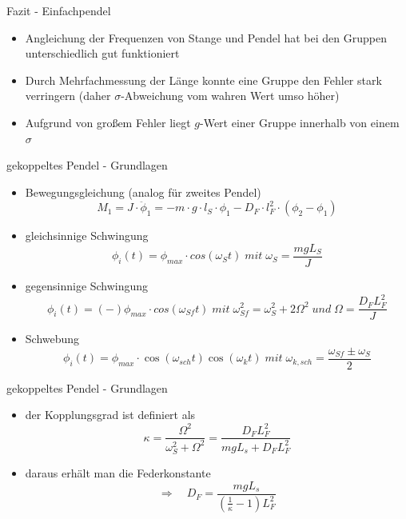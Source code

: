 \documentclass[12pt]{beamer}
\begin{document}
\begin{frame}{Fazit - Einfachpendel}
\begin{itemize}
	\item Angleichung der Frequenzen von Stange und Pendel hat bei den Gruppen unterschiedlich gut funktioniert
	\item Durch Mehrfachmessung der Länge konnte eine Gruppe den Fehler stark verringern (daher $\sigma$-Abweichung vom wahren Wert umso höher)
	\item Aufgrund von großem Fehler liegt $g$-Wert einer Gruppe innerhalb von einem $\sigma$
\end{itemize}
\end{frame}



\begin{frame}{gekoppeltes Pendel - Grundlagen}
\begin{itemize}
	\item Bewegungsgleichung (analog für zweites Pendel)
	\begin{equation*}
	M_1 = J \cdot \ddot \phi_1 = -m \cdot g \cdot l_S \cdot \phi_1 - D_F \cdot l_F^2 \cdot (\phi_2 - \phi_1)
	\end{equation*}
	\item gleichsinnige Schwingung
	\begin{equation*}
	\phi_i(t) = \phi_{max} \cdot cos(\omega_S t) \; mit \; \omega_S = \frac{mgL_S}{J}
	\end{equation*}
	\item gegensinnige Schwingung
	\begin{equation*}
	\phi_i(t) = (-)\phi_{max} \cdot cos(\omega_{Sf} t) \; mit \; \omega_{Sf}^2 = \omega_S^2 + 2\Omega^2 \; und \; \Omega = \frac{D_F L_F^2}{J}
	\end{equation*}
	\item Schwebung
	\begin{equation*}
	\phi_i(t) = \phi_{max} \cdot \cos(\omega_{sch} t)\cos(\omega_k t) \; mit \; \omega_{k,sch} = \frac{\omega_{Sf} \pm \omega_S}{2}
	\end{equation*}
\end{itemize}
\end{frame}

\begin{frame}{gekoppeltes Pendel - Grundlagen}
\begin{itemize}
	\item der Kopplungsgrad ist definiert als
	\begin{equation*}
	\kappa = \frac{\Omega^2}{\omega_S^2 + \Omega^2} = \frac{D_F L_F^2}{mgL_s + D_F L_F^2 }
	\end{equation*}
	\item daraus erhält man die Federkonstante
	\begin{equation*}
	\Rightarrow \quad D_F = \frac{mgL_s}{\left(\frac{1}{\kappa}-1\right) L_F^2 } 
	\end{equation*}
	
\end{itemize}
\end{frame}
\end{document}
